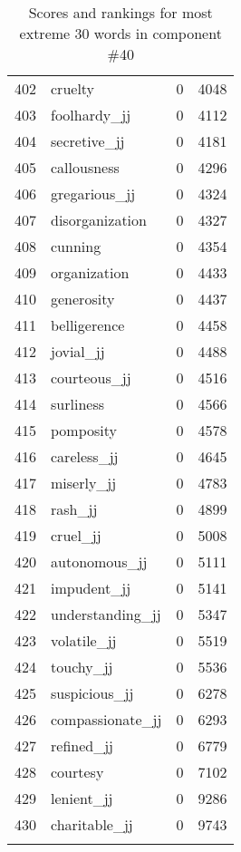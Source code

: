 \begin{longtable}[!htbp]{| rlr@{.}l |}
    402 & cruelty & 0 & 4048 \\
    403 & foolhardy\_jj & 0 & 4112 \\
    404 & secretive\_jj & 0 & 4181 \\
    405 & callousness & 0 & 4296 \\
    406 & gregarious\_jj & 0 & 4324 \\
    407 & disorganization & 0 & 4327 \\
    408 & cunning & 0 & 4354 \\
    409 & organization & 0 & 4433 \\
    410 & generosity & 0 & 4437 \\
    411 & belligerence & 0 & 4458 \\
    412 & jovial\_jj & 0 & 4488 \\
    413 & courteous\_jj & 0 & 4516 \\
    414 & surliness & 0 & 4566 \\
    415 & pomposity & 0 & 4578 \\
    416 & careless\_jj & 0 & 4645 \\
    417 & miserly\_jj & 0 & 4783 \\
    418 & rash\_jj & 0 & 4899 \\
    419 & cruel\_jj & 0 & 5008 \\
    420 & autonomous\_jj & 0 & 5111 \\
    421 & impudent\_jj & 0 & 5141 \\
    422 & understanding\_jj & 0 & 5347 \\
    423 & volatile\_jj & 0 & 5519 \\
    424 & touchy\_jj & 0 & 5536 \\
    425 & suspicious\_jj & 0 & 6278 \\
    426 & compassionate\_jj & 0 & 6293 \\
    427 & refined\_jj & 0 & 6779 \\
    428 & courtesy & 0 & 7102 \\
    429 & lenient\_jj & 0 & 9286 \\
    430 & charitable\_jj & 0 & 9743 \\
    \hline
    \caption{Scores and rankings for most extreme 30 words in component \#40} \\
\end{longtable}
